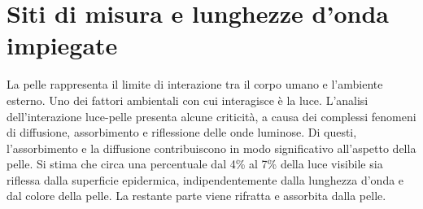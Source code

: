 \section{Siti di misura e lunghezze d'onda impiegate}
La pelle rappresenta il limite di interazione tra il corpo umano e l'ambiente esterno. Uno dei fattori ambientali con cui interagisce è la luce. L'analisi dell'interazione luce-pelle presenta alcune criticità, a causa dei complessi fenomeni di diffusione, assorbimento e riflessione  delle onde luminose. Di questi, l'assorbimento e la diffusione contribuiscono in modo significativo all'aspetto della pelle. Si stima che circa una percentuale dal 4\% al 7\% della luce visibile sia riflessa dalla superficie epidermica, indipendentemente dalla lunghezza d'onda e dal colore della pelle. La restante parte viene rifratta e assorbita dalla pelle. 
\pagebreak
